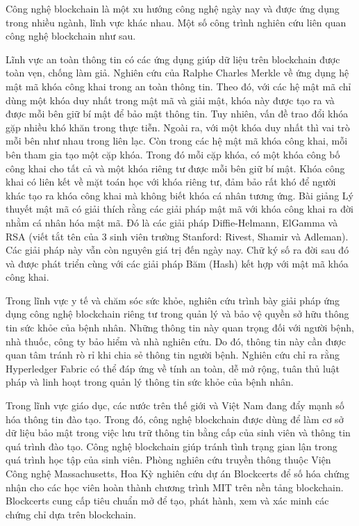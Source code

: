 Công nghệ blockchain là một xu hướng công nghệ ngày nay và được ứng dụng trong nhiều ngành, lĩnh vực khác nhau. Một số công trình nghiên cứu liên quan công nghệ blockchain như sau.

Lĩnh vực an toàn thông tin có các ứng dụng giúp dữ liệu trên blockchain được toàn vẹn, chống làm giả. Nghiên cứu \cite{ralphcharlesmerkle1979} của Ralphe Charles Merkle về ứng dụng hệ mật mã khóa công khai trong an toàn thông tin. Theo đó, với các hệ mật mã chỉ dùng một khóa duy nhất trong mật mã và giải mật, khóa này được tạo ra và được mỗi bên giữ bí mật để bảo mật thông tin. 
Tuy nhiên, vấn đề trao đổi khóa gặp nhiều khó khăn trong thực tiễn.
Ngoài ra, với một khóa duy nhất thì vai trò mỗi bên như nhau trong liên lạc.
Còn trong các hệ mật mã khóa công khai, mỗi bên tham gia tạo một cặp khóa.
Trong đó mỗi cặp khóa, có một khóa công bố công khai cho tất cả và một khóa riêng tư được mỗi bên giữ bí mật.
Khóa công khai có liên kết về mặt toán học với khóa riêng tư, đảm bảo rất khó để người khác tạo ra khóa công khai mà không biết khóa cá nhân tương ứng.
Bài giảng Lý thuyết mật mã\cite{lequyetthang2016} có giải thích rằng các giải pháp mật mã với khóa công khai ra đời nhằm cá nhân hóa mật mã.
Đó là các giải pháp Diffie-Helmann, ElGamma và RSA (viết tắt tên của 3 sinh viên trường Stanford: Rivest, Shamir và Adleman).
Các giải pháp này vẫn còn nguyên giá trị đến ngày nay.
Chữ ký số ra đời sau đó và được phát triển cùng với các giải pháp Băm (Hash) kết hợp với mật mã khóa công khai. 

Trong lĩnh vực y tế và chăm sóc sức khỏe, nghiên cứu \cite{ANTWI2021100012} trình bày giải pháp ứng dụng công nghệ blockchain riêng tư trong quản lý và bảo vệ quyền sở hữu thông tin sức khỏe của bệnh nhân.
Những thông tin này quan trọng đối với người bệnh, nhà thuốc, công ty bảo hiểm và nhà nghiên cứu.
Do đó, thông tin này cần được quan tâm tránh rò rỉ khi chia sẻ thông tin người bệnh.
Nghiên cứu chỉ ra rằng Hyperledger Fabric có thể đáp ứng về tính an toàn, dễ mở rộng, tuân thủ luật pháp và linh hoạt trong quản lý thông tin sức khỏe của bệnh nhân.   

Trong lĩnh vực giáo dục, các nước trên thế giới và Việt Nam đang đẩy mạnh số hóa thông tin đào tạo.
Trong đó, công nghệ blockchain được dùng để làm cơ sở dữ liệu bảo mật trong việc lưu trữ thông tin bằng cấp của sinh viên và thông tin quá trình đào tạo.
Công nghệ blockchain giúp tránh tình trạng gian lận trong quá trình học tập của sinh viên.
Phòng nghiên cứu truyền thông thuộc Viện Công nghệ Massachusetts, Hoa Kỳ nghiên cứu dự án Blockcerts để số hóa chứng nhận cho các học viên hoàn thành chương trình MIT trên nền tảng blockchain.
Blockcerts cung cấp tiêu chuẩn mở để tạo, phát hành, xem và xác minh các chứng chỉ dựa trên blockchain.
